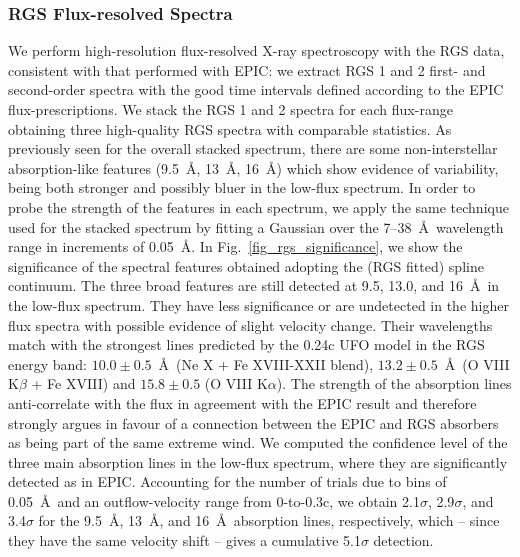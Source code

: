 \documentclass[10pt, a4paper]{article}
\begin{document}
\subsubsection*{RGS Flux-resolved Spectra}
We perform high-resolution flux-resolved X-ray spectroscopy with the RGS data, consistent with that performed with EPIC: we extract RGS 1 and 2 first- and second-order spectra with the good time intervals defined according to the EPIC flux-prescriptions. We stack the RGS 1 and 2 spectra for each flux-range obtaining three high-quality RGS spectra with comparable statistics. %
As previously seen for the overall stacked spectrum, there are some non-interstellar absorption-like features (9.5~\AA , 13~\AA , 16~\AA ) which show evidence of variability, being both stronger and possibly bluer in the low-flux spectrum. In order to probe the strength of the features in each spectrum, we apply the same technique used for the stacked spectrum by fitting a Gaussian over the 7--38~\AA\ wavelength range in increments of 0.05~\AA . In Fig.~\ref{fig_rgs_significance}, we show the significance of the spectral features obtained adopting the (RGS fitted) spline continuum. The three broad features are still detected at 9.5, 13.0, and 16~\AA\ in the low-flux spectrum. They have less significance or are undetected in the higher flux spectra with possible evidence of slight velocity change. Their wavelengths match with the strongest lines predicted by the 0.24c UFO model in the RGS energy band: $10.0 \pm 0.5$~\AA\ (Ne X + Fe XVIII-XXII blend), $13.2 \pm 0.5$~\AA\ (O VIII K$\beta$ + Fe XVIII) and $15.8 \pm 0.5$ (O VIII K$\alpha$). The strength of the absorption lines anti-correlate with the flux in agreement with the EPIC result and therefore strongly argues in favour of a connection between the EPIC and RGS absorbers as being part of the same extreme wind. We computed the confidence level of the three main absorption lines in the low-flux spectrum, where they are significantly detected as in EPIC. Accounting for the number of trials due to bins of 0.05~\AA\ and an outflow-velocity range from 0-to-0.3c, we obtain 2.1$\sigma$, 2.9$\sigma$, and 3.4$\sigma$ for the 9.5~\AA , 13~\AA , and 16~\AA\ absorption lines, respectively, which -- since they have the same velocity shift -- gives a cumulative 5.1$\sigma$ detection.
\end{document}
